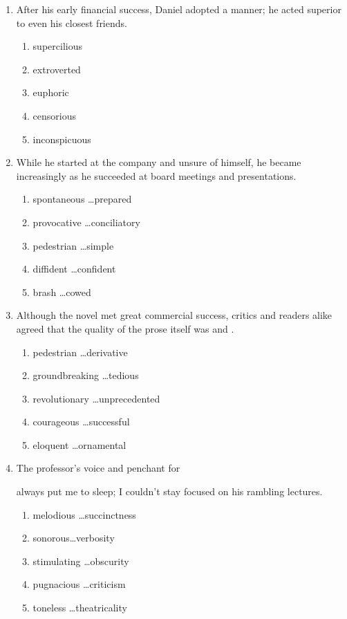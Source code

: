\begin{enumerate}
\newpage
\item After his early financial success, Daniel adopted a \longline  manner; he acted superior to even his closest friends.
\begin{enumerate}[label=(\Alph*)]
\item supercilious
\item extroverted
\item euphoric
\item censorious
\item inconspicuous
\end{enumerate}

\bigskip
\item While he started at the company \longline and unsure of himself, he became increasingly \longline as he succeeded at board meetings and presentations.
\begin{enumerate}[label=(\Alph*)]
\item spontaneous \ldots prepared
\item provocative \ldots conciliatory
\item pedestrian \ldots simple
\item diffident \ldots confident  
\item brash \ldots cowed
\end{enumerate}

\bigskip
\item Although the novel met great commercial success, critics and readers alike agreed that the quality of the prose itself was \longline and \hrulefill.
\begin{enumerate}[label=(\Alph*)]
\item pedestrian \ldots derivative
\item groundbreaking \ldots tedious
\item revolutionary \ldots unprecedented
\item courageous \ldots successful 
\item eloquent \ldots ornamental
\end{enumerate}

\bigskip
\item The professor's \longline voice and penchant for \hrulefill

always put me to sleep; I couldn't stay focused on his rambling lectures.
\begin{enumerate}[label=(\Alph*)]
\item melodious \ldots succinctness
\item sonorous\ldots verbosity
\item stimulating \ldots obscurity
\item pugnacious \ldots criticism 
\item toneless \ldots theatricality
\end{enumerate}


\end{enumerate}
